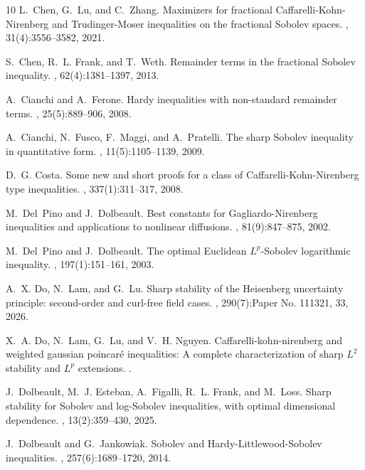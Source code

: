 \documentclass[a4paper,12pt]{article}
\theoremstyle{plain}
\theoremstyle{definition}
\theoremstyle{remark}
\numberwithin{equation}{section}
\begin{document}
\begin{thebibliography}{10}
L.~Chen, G.~Lu, and C.~Zhang.
\newblock Maximizers for fractional {C}affarelli-{K}ohn-{N}irenberg and
  {T}rudinger-{M}oser inequalities on the fractional {S}obolev spaces.
, 31(4):3556--3582, 2021.

S.~Chen, R.~L. Frank, and T.~Weth.
\newblock Remainder terms in the fractional {S}obolev inequality.
, 62(4):1381--1397, 2013.

A.~Cianchi and A.~Ferone.
\newblock Hardy inequalities with non-standard remainder terms.
,
  25(5):889--906, 2008.

A.~Cianchi, N.~Fusco, F.~Maggi, and A.~Pratelli.
\newblock The sharp {S}obolev inequality in quantitative form.
, 11(5):1105--1139, 2009.

D.~G. Costa.
\newblock Some new and short proofs for a class of
  {C}affarelli-{K}ohn-{N}irenberg type inequalities.
, 337(1):311--317, 2008.

M.~Del~Pino and J.~Dolbeault.
\newblock Best constants for {G}agliardo-{N}irenberg inequalities and
  applications to nonlinear diffusions.
, 81(9):847--875, 2002.

M.~Del~Pino and J.~Dolbeault.
\newblock The optimal {E}uclidean {$L^p$}-{S}obolev logarithmic inequality.
, 197(1):151--161, 2003.

A.~X. Do, N.~Lam, and G.~Lu.
\newblock Sharp stability of the {H}eisenberg uncertainty principle:
  second-order and curl-free field cases.
, 290(7):Paper No. 111321, 33, 2026.

X.~A. Do, N.~Lam, G.~Lu, and V.~H. Nguyen.
\newblock Caffarelli-kohn-nirenberg and weighted gaussian poincar\'e
  inequalities: A complete characterization of sharp {$L^2$} stability and
  {$L^p$} extensions.
.

J.~Dolbeault, M.~J. Esteban, A.~Figalli, R.~L. Frank, and M.~Loss.
\newblock Sharp stability for {S}obolev and log-{S}obolev inequalities, with
  optimal dimensional dependence.
, 13(2):359--430, 2025.

J.~Dolbeault and G.~Jankowiak.
\newblock Sobolev and {H}ardy-{L}ittlewood-{S}obolev inequalities.
, 257(6):1689--1720, 2014.


\end{thebibliography}
\end{document}
